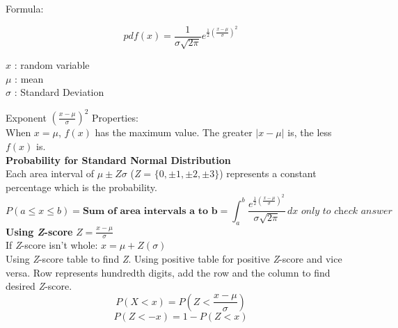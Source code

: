 \documentclass{article}
\begin{document}
\begin{minipage}[t]{0.5\textwidth}
\begin{center}
    Formula:
\end{center}
    \Large \[pdf(x) = \frac{1}{\sigma\sqrt{2\pi}}e^{\frac{1}{2}(\frac{x-\mu}{\sigma})^2}\]
\end{minipage}
\begin{minipage}[t]{0.5\textwidth}
\begin{center}
    \(x\) : random variable\\
    \(\mu\) : mean\\
    \(\sigma\) : Standard Deviation
\end{center}
\end{minipage}
\[\]
Exponent \((\frac{x-\mu}{\sigma})^2\) Properties:\\
When \(x = \mu\), \(f(x)\) has the maximum value. The greater \(|x - \mu|\) is, the less \(f(x)\) is.\\

\large \textbf{Probability for Standard Normal Distribution}\\
Each area interval of \(\mu \pm \textit{Z}\sigma\) (\textit{Z} = \(\{0,\pm1,\pm2,\pm3\}\)) represents a constant percentage which is the probability.
\[P(a \leq x \leq b) = \textbf{Sum of area intervals a to b} = \int_{a}^{b} \frac{e^{\frac{1}{2}(\frac{x-\mu}{\sigma})^2}}{\sigma\sqrt{2\pi}} \,dx \textit{  only to check answer}\]
\large \textbf{Using \textit{Z}-score} \(\textit{Z} = \frac{x-\mu}{\sigma}\)\\
If \textit{Z}-score isn't whole: \(x = \mu + \textit{Z}(\sigma)\)\\
Using \textit{Z}-score table to find \textit{Z}. Using positive table for positive \textit{Z}-score and vice versa. Row represents hundredth digits, add the row and the column to find desired \textit{Z}-score.
\[P(X<x) = P(\textit{Z} < \frac{x-\mu}{\sigma})\]
\[P(\textit{Z} < -x) = 1 - P(\textit{Z} < x)\]
\end{document}
